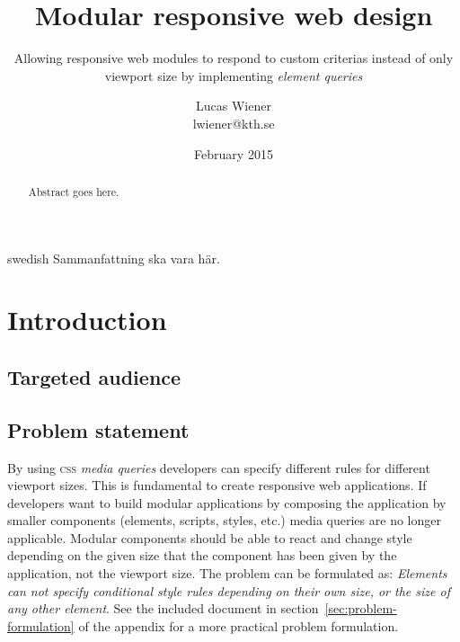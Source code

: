 \documentclass[a4paper,11pt]{kth-mag}
\title{Modular responsive web design}
\subtitle{Allowing responsive web modules to respond to custom criterias instead of only viewport size by implementing \emph{element queries}}
\author{Lucas Wiener \\ \lowercase{lwiener@kth.se}}
\date{February 2015}
\begin{document}
  \frontmatter
  \pagestyle{empty}
  \removepagenumbers
  \maketitle
  \begin{abstract}
    Abstract goes here.
  \end{abstract}
  \clearpage
  \begin{foreignabstract}{swedish}
    Sammanfattning ska vara här.
  \end{foreignabstract}
  \clearpage
  \tableofcontents*
  \mainmatter
  \pagestyle{newchap}
  \chapter{Introduction}
    \section{Targeted audience}
    \section{Problem statement}
      By using \textsc{css} \emph{media queries} developers can specify different rules for different viewport sizes.
      This is fundamental to create responsive web applications.
      If developers want to build modular applications by composing the application by smaller components (elements, scripts, styles, etc.) media queries are no longer applicable.
      Modular components should be able to react and change style depending on the given size that the component has been given by the application, not the viewport size.
      The problem can be formulated as: \emph{Elements can not specify conditional style rules depending on their own size, or the size of any other element}.
      See the included document in section~\ref{sec:problem-formulation} of the appendix for a more practical problem formulation.
\end{document}
